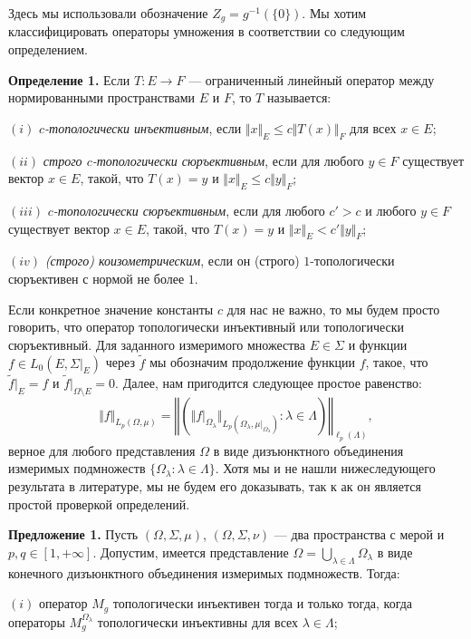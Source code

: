 \documentclass[11pt,twoside]{article}
\begin{document}
Здесь мы использовали обозначение $Z_g=g^{-1}(\{0\})$. Мы хотим классифицировать
операторы умножения в соответствии со следующим определением.

\textbf{Определение 1.} Если $ T:E\to F$ --- ограниченный линейный оператор
между нормированными пространствами $E$ и $F$, то $ T$ называется:

$(i)$ \textit{$c$-топологически инъективным}, если $\Vert x\Vert_E\leq c\Vert
    T(x)\Vert_F$ для всех $x \in E$;

$(ii)$ \textit{строго $c$-топологически сюръективным}, если для любого $y\in F$
существует вектор $x \in E$, такой, что $ T(x) = y$ и $\Vert x \Vert_E \leq c
    \Vert y \Vert_F$;

$(iii)$ \textit{$c$-топологически сюръективным}, если для любого $c'>c$ и любого
$y\in F$ существует вектор $x \in E$, такой, что $ T(x) = y$ и $\Vert x \Vert_E
    < c' \Vert y \Vert_F$;

$(iv)$ \textit{(строго) коизометрическим}, если он (строго) $1$-топологически
сюръективен с нормой не более $1$.


Если конкретное значение константы $c$ для нас не важно, то мы будем просто
говорить, что оператор топологически инъективный или топологически сюръективный.
Для заданного измеримого множества $E\in \Sigma$ и функции 
$f\in L_0(E,\Sigma|_{E})$ через $\widetilde{f}$ 
мы обозначим продолжение функции $f$,
такое, что $\widetilde{f}|_E=f$ и $\widetilde{f}|_{\Omega\setminus E}=0$. Далее,
нам пригодится следующее простое равенство:
$$
    \Vert f\Vert_{L_p(\Omega,\mu)}
    =\left\Vert\left(
    \Vert f|_{\Omega_\lambda}\Vert_{L_p(\Omega_\lambda,\mu|_{\Omega_\lambda})}:
    \lambda\in\Lambda
    \right)\right\Vert_{\ell_p(\Lambda)},
$$
верное для любого представления $\Omega$ в виде дизъюнктного объединения
измеримых подмножеств $\{\Omega_\lambda:\lambda\in\Lambda \}$. Хотя мы и не
нашли нижеследующего результата в литературе, мы не будем его доказывать, так к
ак он является простой проверкой определений.

\textbf{Предложение 1.} Пусть $(\Omega,\Sigma,\mu)$, $(\Omega,\Sigma,\nu)$ ---
два пространства с мерой и $p,q\in[1,+\infty]$. Допустим, имеется представление
$\Omega=\bigcup_{\lambda\in\Lambda}\Omega_\lambda$ в виде конечного дизъюнктного
объединения измеримых подмножеств. Тогда:

$(i)$ оператор $M_g$ топологически инъективен тогда и только тогда, когда
операторы $M_g^{\Omega_\lambda}$ топологически инъективны для всех
$\lambda\in\Lambda$;
\end{document}

